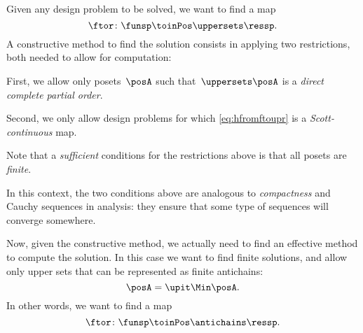 Given any design problem to be solved, we want to find a map
%
\begin{equation}
    \label{eq:hfromftoupr}
    \ftor\colon \funsp \toinPos \uppersets \ressp.
\end{equation}
%
%
A constructive method to find the solution consists in applying two restrictions, both needed to allow for computation:
\begin{compactenum}
    \item First, we allow only posets~$\posA$ such that~$\uppersets \posA$ is a \emph{direct complete partial order}.
    \item Second, we only allow design problems for which \cref{eq:hfromftoupr} is a \emph{Scott-continuous} map.
\end{compactenum}
Note that a \emph{sufficient} conditions for the restrictions above is that all posets are \emph{finite}.
\begin{remark}
    In this context, the two conditions above are analogous to \emph{compactness} and Cauchy sequences in analysis: they ensure that some type of sequences will converge somewhere.
\end{remark}


Now, given the constructive method, we actually need to find an effective method to compute the solution.
In this case we want to find finite solutions, and allow only upper sets that can be represented as finite antichains:
\begin{equation*}
    \posA=\upit \Min \posA.
\end{equation*}
In other words, we want to find a map
\begin{equation}
    \label{eq:hfromftoantir}
    \ftor\colon \funsp \toinPos \antichains \ressp.
\end{equation}
%

